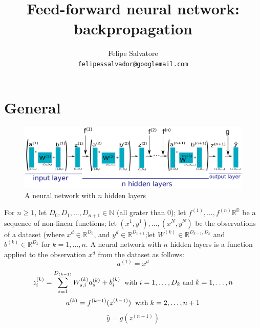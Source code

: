 \documentclass{article}
\title{Feed-forward neural network: backpropagation}
\author{Felipe Salvatore\\
\texttt{felipessalvador@googlemail.com}}
\begin{document}
\maketitle
\section{General}
\begin{figure}
\begin{center}
\includegraphics[scale=0.85]{abstrat_neural.pdf}
\end{center}
\caption{A neural network with $n$ hidden layers}
\label{abstract_neural}
\end{figure}
For $n\geq 1$, let $D_0, D_1, \dots, D_{n+1} \in \mathbb{N}$ (all grater than 0); let $f^{(1)}, \dots, f^{(n)} \mathbb{R}^{\mathbb{R}}$ be a sequence of non-linear functions; let $(x^1,y^1), \dots, (x^N,y^N)$ be the observations of a dataset (where $x^{d} \in \mathbb{R}^{D_{0}}$, and $y^{d} \in \mathbb{R}^{D_{n+1}}$;let $W^{(k)} \in \mathbb{R}^{D_{k-1},D_{k}}$  and $b^{(k)} \in \mathbb{R}^{D_{k}}$ for $k =1, \dots, n$. A neural network with $n$ hidden layers is a function applied to the observation $x^{d}$ from the dataset as follows:
\begin{equation}\label{eq:0}
a^{(1)} =x^{d}
\end{equation}
 \begin{equation}\label{eq:1}
z^{(k)}_{i} = \sum_{s=1}^{D_{(k-1)}}W^{(k)}_{s,i} a^{(k)}_{s} + b^{(k)}_{i}  \; {\small \text{ with }i = 1, \dots, D_{k} \text{ and }k = 1, \dots, n}
\end{equation}
\begin{equation}\label{eq:2}
a^{(k)} = f^{(k-1)}(z^{(k-1)})   \; {\small \text{ with }k = 2, \dots, n+1}
\end{equation}
\begin{equation}\label{eq:3}
\hat{y} = g(z^{(n+1)})
\end{equation}
\end{document}
